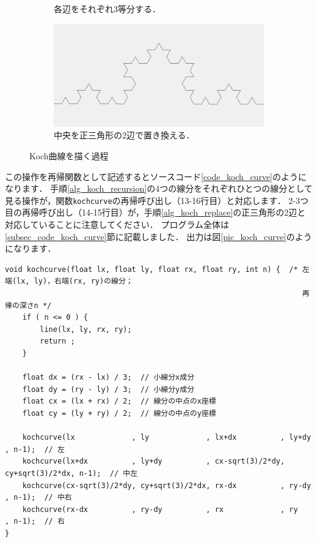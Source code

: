 \documentclass[dvipdfmx]{jsarticle}
\theoremstyle{definition}
\begin{document}
\begin{figure}[H]
\begin{subfigure}{0.325\textwidth}
        \caption{各辺をそれぞれ3等分する．}
        \label{fig_proc_kochcurve2_split}
    \end{subfigure}
    \begin{subfigure}{0.325\textwidth}
        \centering
        \includegraphics[width=\textwidth]{figure/koch/koch_curve3.png}
        \caption{中央を正三角形の2辺で置き換える．}
        \label{fig_proc_kochcurve3}
    \end{subfigure}
    \caption{Koch曲線を描く過程}
    \label{fig_process_koch_curve}
\end{figure}
%
この操作を再帰関数として記述するとソースコード\ref{code_koch_curve}のようになります．
手順\ref{alg_koch_recursion}の4つの線分をそれぞれひとつの線分として見る操作が，関数\verb|kochcurve|の再帰呼び出し（13-16行目）と対応します．
2-3つ目の再帰呼び出し（14-15行目）が，手順\ref{alg_koch_replace}の正三角形の2辺と対応していることに注意してください．
プログラム全体は\ref{subsec_code_koch_curve}節に記載しました．
出力は図\ref{pic_koch_curve}のようになります．
%
\begin{lstlisting}[caption=Koch曲線を描く再帰関数, label=code_koch_curve]
void kochcurve(float lx, float ly, float rx, float ry, int n) {  /* 左端(lx, ly)，右端(rx, ry)の線分；
                                                                    再帰の深さn */
    if ( n <= 0 ) {
        line(lx, ly, rx, ry);
        return ;
    }

    float dx = (rx - lx) / 3;  // 小線分x成分
    float dy = (ry - ly) / 3;  // 小線分y成分
    float cx = (lx + rx) / 2;  // 線分の中点のx座標
    float cy = (ly + ry) / 2;  // 線分の中点のy座標

    kochcurve(lx             , ly             , lx+dx          , ly+dy          , n-1);  // 左
    kochcurve(lx+dx          , ly+dy          , cx-sqrt(3)/2*dy, cy+sqrt(3)/2*dx, n-1);  // 中左
    kochcurve(cx-sqrt(3)/2*dy, cy+sqrt(3)/2*dx, rx-dx          , ry-dy          , n-1);  // 中右
    kochcurve(rx-dx          , ry-dy          , rx             , ry             , n-1);  // 右
}
\end{lstlisting}
\end{document}
